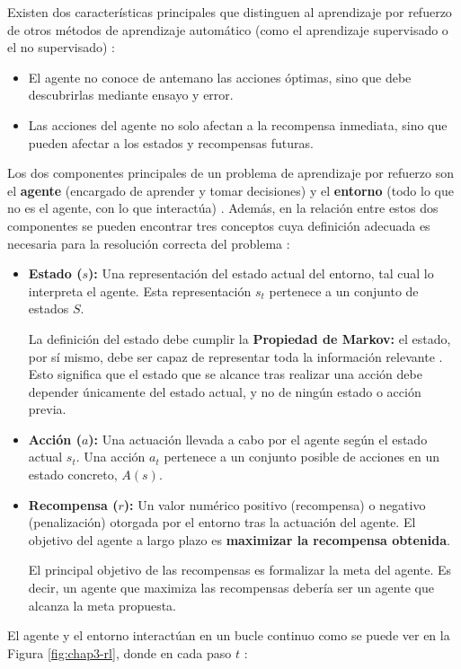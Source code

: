 Existen dos características principales que distinguen al aprendizaje por refuerzo de otros métodos de aprendizaje automático (como el aprendizaje supervisado o el no supervisado) \cite{Sutton1998}:
\begin{itemize}
	\item El agente no conoce de antemano las acciones óptimas, sino que debe descubrirlas mediante ensayo y error.
	\item Las acciones del agente no solo afectan a la recompensa inmediata, sino que pueden afectar a los estados y recompensas futuras.
\end{itemize}

Los dos componentes principales de un problema de aprendizaje por refuerzo son el \textbf{agente} (encargado de aprender y tomar decisiones) y el \textbf{entorno} (todo lo que no es el agente, con lo que interactúa) \cite{Sutton1998}. Además, en la relación entre estos dos componentes se pueden encontrar tres conceptos cuya definición adecuada es necesaria para la resolución correcta del problema \cite{Sutton1998}:
\begin{itemize}
 \item \textbf{Estado ($s$):} Una representación del estado actual del entorno, tal cual lo interpreta el agente. Esta representación $s_t$ pertenece a un conjunto de estados $S$.
 
 La definición del estado debe cumplir la \textbf{Propiedad de Markov:} el estado, por sí mismo, debe ser capaz de representar toda la información relevante \cite{Sutton1998}. Esto significa que el estado que se alcance tras realizar una acción debe depender únicamente del estado actual, y no de ningún estado o acción previa.
 \item \textbf{Acción ($a$):} Una actuación llevada a cabo por el agente según el estado actual $s_t$. Una acción $a_t$ pertenece a un conjunto posible de acciones en un estado concreto, $A(s)$.
 \item \textbf{Recompensa ($r$):} Un valor numérico positivo (recompensa) o negativo (penalización) otorgada por el entorno tras la actuación del agente. El objetivo del agente a largo plazo es \textbf{maximizar la recompensa obtenida}.
 
 El principal objetivo de las recompensas es formalizar la meta del agente. Es decir, un agente que maximiza las recompensas debería ser un agente que alcanza la meta propuesta.
\end{itemize}

El agente y el entorno interactúan en un bucle continuo como se puede ver en la Figura \ref{fig:chap3-rl}, donde en cada paso $t$ \cite{Sutton1998}:

